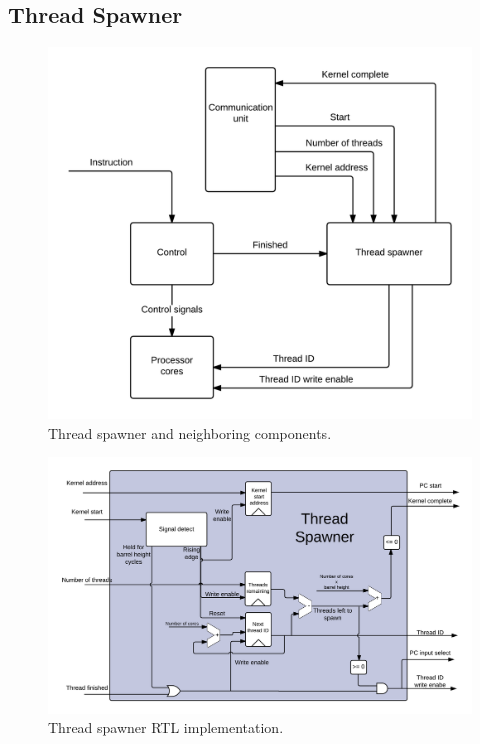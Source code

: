 \subsection{Thread Spawner}


\begin{figure}[H]
	\centering
	\includegraphics[width=1.1\textwidth]{../gpu/diagrams/thread_spawner_overview.png}
	\caption{Thread spawner and neighboring components.}
	\label{fig:thread_spawner_overview}
\end{figure}
\begin{figure}[H]
	\centering
	\includegraphics[width=1.1\textwidth]{../gpu/diagrams/thread_spawner.png}
	\caption{Thread spawner RTL implementation.}
	\label{fig:thread_spawner_rtl}
\end{figure}

